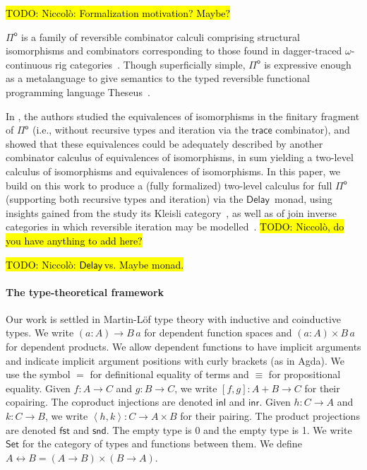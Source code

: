 \documentclass[runningheads,a4paper]{llncs}
\newcommand{\Pio}{\ensuremath{\mathsf{\Pi}^{\mathsf{o}}}}
\newcommand{\Set}{\mathsf{Set}}
\newcommand{\U}{\mathcal{U}}
\newcommand{\copair}[2]{[#1,#2]}
\newcommand{\pair}[2]{\left< #1,#2 \right>}
\newcommand{\inl}{\mathsf{inl}}
\newcommand{\inr}{\mathsf{inr}}
\newcommand{\fst}{\mathsf{fst}}
\newcommand{\snd}{\mathsf{snd}}
\newcommand{\trace}{\ensuremath{\mathsf{trace}}}
\newcommand{\Delay}{\ensuremath{\mathsf{Delay}\,}}
\newcommand{\todo}[1]{\hl{TODO: #1}}
\begin{document}
\todo{Niccol\`{o}: Formalization motivation? Maybe?}

\Pio{} is a family of reversible combinator calculi comprising structural
isomorphisms and combinators corresponding to those found in dagger-traced
$\omega$-continuous rig categories~\cite{Karvonen19}. Though superficially
simple, \Pio{} is expressive enough as a metalanguage to give semantics to the
typed reversible functional programming language Theseus~\cite{JamesS14}.

In \cite{CaretteS16}, the authors studied the equivalences of isomorphisms in
the finitary fragment of \Pio{} (i.e., without recursive types and iteration
via the \trace{} combinator), and showed that these equivalences could be
adequately described by another combinator calculus of equivalences of
isomorphisms, in sum yielding a two-level calculus of isomorphisms and
equivalences of isomorphisms. In this paper, we build on this work to produce a
(fully formalized) two-level calculus for full \Pio{} (supporting both recursive
types and iteration) via the \Delay{} monad, using insights gained from the
study its Kleisli category~\cite{UustaluV17,ChapmanUV19,VeltriPhD}, as well as
of join inverse categories in which reversible
iteration may be modelled~\cite{KaarsgaardAG17}. \todo{Niccol\`{o}, do you have anything to add here?}

\todo{Niccol\`{o}: \Delay vs. Maybe monad.}

\paragraph{The type-theoretical framework}

Our work is settled in Martin-L\"of type theory with inductive and
coinductive types. We write $(a : A) \to B \,a$ for dependent function
spaces and $(a : A) \times B \,a$ for dependent products. We allow
dependent functions to have implicit arguments and indicate implicit
argument positions with curly brackets (as in Agda). We use the
symbol $=$ for definitional equality of terms and $\equiv$ for
propositional equality. Given $f : A \to C$ and
$g : B \to C$, we write $\copair f g : A + B \to C$ for their
copairing. The coproduct injections are denoted $\inl$ and $\inr$.
Given $h : C \to A$ and $k : C \to B$, we write
$\pair h k : C \to A \times B$ for their pairing. The product
projections are denoted $\fst$ and $\snd$. The empty type is 0 and the
empty type is 1. We write $\Set$ for the category of
types and functions between them.
We define $A \leftrightarrow B = (A \to B) \times (B \to A)$.
\end{document}
